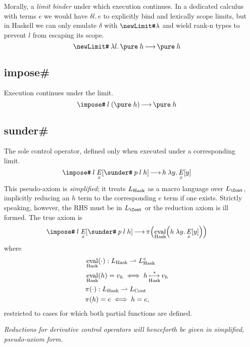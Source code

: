 \documentclass{report}
\begin{document}
Morally, a \emph{limit binder} under which execution continues.
In a dedicated calculus with terms \( e \) we would have \( \delta l. \, e \) to explicitly bind and lexically scope limits, but in Haskell we can only emulate \( \delta \) with \( \newLimit\hash \lambda \) and wield rank-n types to prevent \( l \) from escaping its scope.
\[
  \newLimit\hash \app \lam l {\pure \app h}
    \redAx \pure \app h
\]


\subsection{impose\#} %

Execution continues under the limit.
\[
  \impose\hash \app l \app {\left( \pure \app h \right)}
    \redAx \pure \app h
\]


\subsection{sunder\#} %

The sole control operator, defined only when executed under a corresponding limit.
\[
  \impose\hash \app l
    \app {\E_x} \sq{\sunder\hash \app p \app l \app h}
      \redAx h \app \lam y {{\E_x} \sq y}
\]
This pseudo-axiom is \emph{simplified}; it treats \( L_{\text{Hask}} \) as a macro language over \( L_\Cont \), implicitly reducing an \( h \) term to the corresponding \( e \) term if one exists.
Strictly speaking, however, the RHS must be in \( L_\Cont \) or the reduction axiom is ill formed.
The true axiom is \[
  \impose\hash \app l
    \app {\E_x} \sq{\sunder\hash \app p \app l \app h}
      \redAx {\proj} \br{
        {\eval_\Hask} \br{h \app \lam y {{\E_x} \sq y}}
      }
\] where \begin{align*}
  &\operatorname*{\mathrm{eval}}_{\text{Hask}}(\cdot) : L_{\text{Hask}} \rightharpoonup L_{\text{Hask}}^v \\
  &\operatorname*{\mathrm{eval}}_{\text{Hask}}(h) = v_h \iff h \operatorname*{\mathrel{\longmapsto}}_{\text{Hask}}^* v_h \\
  &{\operatorname*{\pi}} {\left(\cdot\right)} : L_{\text{Hask}} \rightharpoonup L_\text{Cont} \\
  &{\operatorname*{\pi}} {\left(h\right)} = e \iff h = e,
\end{align*}
restricted to cases for which both partial functions are defined.

\emph{Reductions for derivative control operators will henceforth be given in simplified, pseudo-axiom form.}


\end{document}
